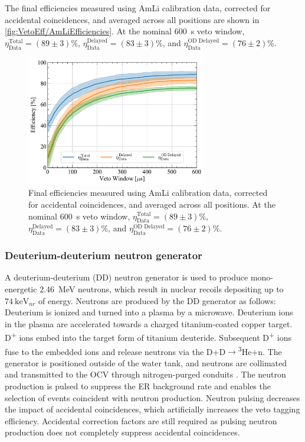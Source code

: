 The final efficiencies measured using AmLi calibration data, corrected for accidental coincidences, and averaged across all positions are shown in \autoref{fig:VetoEff/AmLiEfficiencies}. At the nominal 600~\textmu s veto window, $\eta^\text{Total}_\text{Data}=(89\pm3)\%$, $\eta^\text{Delayed}_\text{Data}=(83\pm3)\%$, and $\eta^\text{OD Delayed}_\text{Data}=(76\pm2)\%$.

\begin{figure}[!ht]
    \centering
    \includegraphics[width=0.7\textwidth]{figures/VetoEfficiency/AmLiEfficiencies_Data.pdf}
    \caption[Final efficiencies measured using AmLi calibration data, corrected for accidental coincidences.]{Final efficiencies measured using AmLi calibration data, corrected for accidental coincidences, and averaged across all positions. At the nominal 600~\textmu s veto window, $\eta^\text{Total}_\text{Data}=(89\pm3)\%$, $\eta^\text{Delayed}_\text{Data}=(83\pm3)\%$, and $\eta^\text{OD Delayed}_\text{Data}=(76\pm2)\%$.}
    \label{fig:VetoEff/AmLiEfficiencies}
\end{figure}

\subsubsection{Deuterium-deuterium neutron generator}
A deuterium-deuterium (DD) neutron generator is used to produce mono-energetic 2.46~MeV neutrons, which result in nuclear recoils depositing up to $74~\text{keV}_{nr}$ of energy. Neutrons are produced by the DD generator as follows: Deuterium is ionized and turned into a plasma by a microwave. Deuterium ions in the plasma are accelerated towards a charged titanium-coated copper target. D\textsuperscript{+} ions embed into the target form of titanium deuteride. Subsequent D\textsuperscript{+} ions fuse to the embedded ions and release neutrons via the D+D$\rightarrow$\textsuperscript{3}He+n. The generator is positioned outside of the water tank, and neutrons are collimated and transmitted to the OCV through nitrogen-purged conduits \cite{LZ:2024bsz}. The neutron production is pulsed to suppress the ER background rate and enables the selection of events coincident with neutron production. Neutron pulsing decreases the impact of accidental coincidences, which artificially increases the veto tagging efficiency. Accidental correction factors are still required as pulsing neutron production does not completely suppress accidental coincidences.

